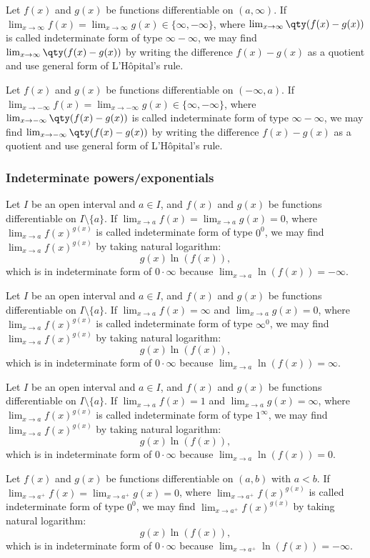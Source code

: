 Let $f(x)$ and $g(x)$ be functions differentiable on $(a,\infty)$. If $\lim_{x\to\infty}f(x)=\lim_{x\to\infty}g(x)\in\{\infty,-\infty\}$, where $\lim_{x\to\infty}\qty(f(x)-g(x))$ is called indeterminate form of type $\infty-\infty$, we may find $\lim_{x\to\infty}\qty(f(x)-g(x))$ by writing the difference $f(x)-g(x)$ as a quotient and use general form of L'Hôpital's rule.

Let $f(x)$ and $g(x)$ be functions differentiable on $(-\infty,a)$. If $\lim_{x\to -\infty}f(x)=\lim_{x\to -\infty}g(x)\in\{\infty,-\infty\}$, where $\lim_{x\to -\infty}\qty(f(x)-g(x))$ is called indeterminate form of type $\infty-\infty$, we may find $\lim_{x\to -\infty}\qty(f(x)-g(x))$ by writing the difference $f(x)-g(x)$ as a quotient and use general form of L'Hôpital's rule.
\subsubsection{Indeterminate powers/exponentials}
Let $I$ be an open interval and $a\in I$, and $f(x)$ and $g(x)$ be functions differentiable on $I\setminus\{a\}$. If $\lim_{x\to a}f(x)=\lim_{x\to a}g(x)=0$, where $\lim_{x\to a}f(x)^{g(x)}$ is called indeterminate form of type $0^0$, we may find $\lim_{x\to a}f(x)^{g(x)}$ by taking natural logarithm:
\[g(x)\ln(f(x)),\]
which is in indeterminate form of $0\cdot\infty$ because $\lim_{x\to a}\ln(f(x))=-\infty$.

Let $I$ be an open interval and $a\in I$, and $f(x)$ and $g(x)$ be functions differentiable on $I\setminus\{a\}$. If $\lim_{x\to a}f(x)=\infty$ and $\lim_{x\to a}g(x)=0$, where $\lim_{x\to a}f(x)^{g(x)}$ is called indeterminate form of type $\infty^0$, we may find $\lim_{x\to a}f(x)^{g(x)}$ by taking natural logarithm:
\[g(x)\ln(f(x)),\]
which is in indeterminate form of $0\cdot\infty$ because $\lim_{x\to a}\ln(f(x))=\infty$.

Let $I$ be an open interval and $a\in I$, and $f(x)$ and $g(x)$ be functions differentiable on $I\setminus\{a\}$. If $\lim_{x\to a}f(x)=1$ and $\lim_{x\to a}g(x)=\infty$, where $\lim_{x\to a}f(x)^{g(x)}$ is called indeterminate form of type $1^{\infty}$, we may find $\lim_{x\to a}f(x)^{g(x)}$ by taking natural logarithm:
\[g(x)\ln(f(x)),\]
which is in indeterminate form of $0\cdot\infty$ because $\lim_{x\to a}\ln(f(x))=0$.

Let $f(x)$ and $g(x)$ be functions differentiable on $(a,b)$ with $a<b$. If $\lim_{x\to a^+}f(x)=\lim_{x\to a^+}g(x)=0$, where $\lim_{x\to a^+}f(x)^{g(x)}$ is called indeterminate form of type $0^0$, we may find $\lim_{x\to a^+}f(x)^{g(x)}$ by taking natural logarithm:
\[g(x)\ln(f(x)),\]
which is in indeterminate form of $0\cdot\infty$ because $\lim_{x\to a^+}\ln(f(x))=-\infty$.

